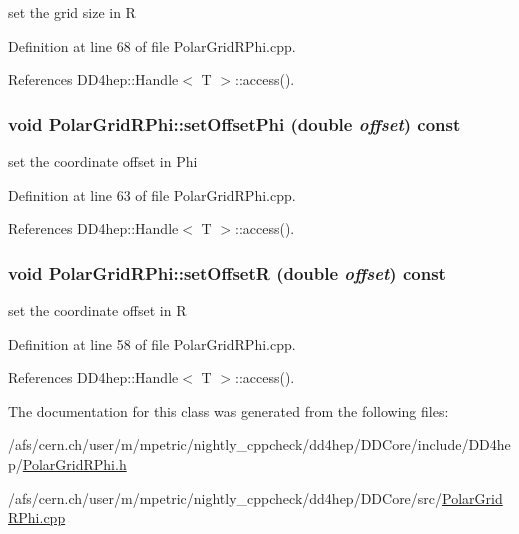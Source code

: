 set the grid size in R 

Definition at line 68 of file PolarGridRPhi.cpp.

References DD4hep::Handle$<$ T $>$::access().\hypertarget{class_d_d4hep_1_1_geometry_1_1_polar_grid_r_phi_ae53bea53de48d402529d5169439c0183}{
\subsubsection[{setOffsetPhi}]{\setlength{\rightskip}{0pt plus 5cm}void PolarGridRPhi::setOffsetPhi (double {\em offset}) const}}
\label{class_d_d4hep_1_1_geometry_1_1_polar_grid_r_phi_ae53bea53de48d402529d5169439c0183}


set the coordinate offset in Phi 

Definition at line 63 of file PolarGridRPhi.cpp.

References DD4hep::Handle$<$ T $>$::access().\hypertarget{class_d_d4hep_1_1_geometry_1_1_polar_grid_r_phi_ae9a0cd01fdf994e6e756e3746ae8db59}{
\subsubsection[{setOffsetR}]{\setlength{\rightskip}{0pt plus 5cm}void PolarGridRPhi::setOffsetR (double {\em offset}) const}}
\label{class_d_d4hep_1_1_geometry_1_1_polar_grid_r_phi_ae9a0cd01fdf994e6e756e3746ae8db59}


set the coordinate offset in R 

Definition at line 58 of file PolarGridRPhi.cpp.

References DD4hep::Handle$<$ T $>$::access().

The documentation for this class was generated from the following files:\begin{DoxyCompactItemize}
\item 
/afs/cern.ch/user/m/mpetric/nightly\_\-cppcheck/dd4hep/DDCore/include/DD4hep/\hyperlink{_d_d_core_2include_2_d_d4hep_2_polar_grid_r_phi_8h}{PolarGridRPhi.h}\item 
/afs/cern.ch/user/m/mpetric/nightly\_\-cppcheck/dd4hep/DDCore/src/\hyperlink{_d_d_core_2src_2_polar_grid_r_phi_8cpp}{PolarGridRPhi.cpp}\end{DoxyCompactItemize}
